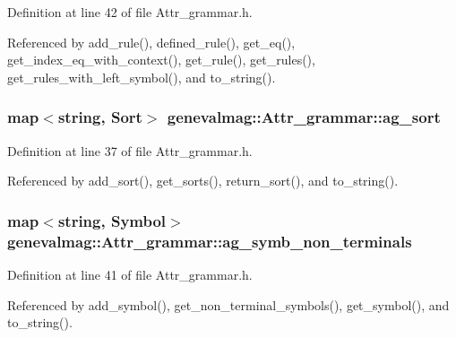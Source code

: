 Definition at line 42 of file Attr\_\-grammar.h.



Referenced by add\_\-rule(), defined\_\-rule(), get\_\-eq(), get\_\-index\_\-eq\_\-with\_\-context(), get\_\-rule(), get\_\-rules(), get\_\-rules\_\-with\_\-left\_\-symbol(), and to\_\-string().

\hypertarget{classgenevalmag_1_1Attr__grammar_a799dddeffb394e06770b8143b46cbc87}{
\subsubsection[{ag\_\-sort}]{\setlength{\rightskip}{0pt plus 5cm}map$<$string, {\bf Sort}$>$ {\bf genevalmag::Attr\_\-grammar::ag\_\-sort}}}
\label{classgenevalmag_1_1Attr__grammar_a799dddeffb394e06770b8143b46cbc87}


Definition at line 37 of file Attr\_\-grammar.h.



Referenced by add\_\-sort(), get\_\-sorts(), return\_\-sort(), and to\_\-string().

\hypertarget{classgenevalmag_1_1Attr__grammar_a82631f05839109d0569a1554a35fa906}{
\subsubsection[{ag\_\-symb\_\-non\_\-terminals}]{\setlength{\rightskip}{0pt plus 5cm}map$<$string, {\bf Symbol}$>$ {\bf genevalmag::Attr\_\-grammar::ag\_\-symb\_\-non\_\-terminals}}}
\label{classgenevalmag_1_1Attr__grammar_a82631f05839109d0569a1554a35fa906}


Definition at line 41 of file Attr\_\-grammar.h.



Referenced by add\_\-symbol(), get\_\-non\_\-terminal\_\-symbols(), get\_\-symbol(), and to\_\-string().

